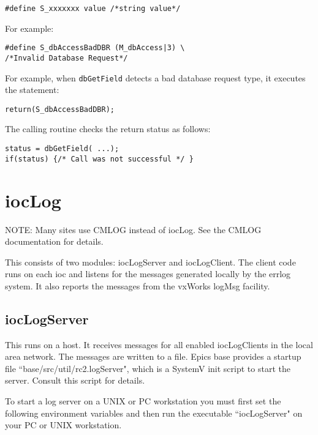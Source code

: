 \begin{verbatim}
#define S_xxxxxxx value /*string value*/
\end{verbatim}

For example:

\begin{verbatim}
#define S_dbAccessBadDBR (M_dbAccess|3) \
/*Invalid Database Request*/
\end{verbatim}

For example, when \verb|dbGetField| detects a bad database request type, it executes the statement:

\begin{verbatim}
return(S_dbAccessBadDBR);
\end{verbatim}

The calling routine checks the return status as follows:

\begin{verbatim}
status = dbGetField( ...);
if(status) {/* Call was not successful */ }
\end{verbatim}

\section{iocLog}

NOTE: Many sites use CMLOG instead of iocLog. See the CMLOG documentation for details.

This consists of two modules: iocLogServer and iocLogClient. The client code runs on each ioc and listens for the 
messages generated locally by the errlog system. It also reports the messages from the vxWorks logMsg facility.

\subsection{iocLogServer}

This runs on a host. It receives messages for all enabled iocLogClients in the local area network. The messages are written 
to a file. Epics base provides a startup file ``base/src/util/rc2.logServer", which is a SystemV init script to start the server. 
Consult this script for details.

To start a log server on a UNIX or PC workstation you must first set the following environment variables and then run the 
executable ``iocLogServer" on your PC or UNIX workstation. 

